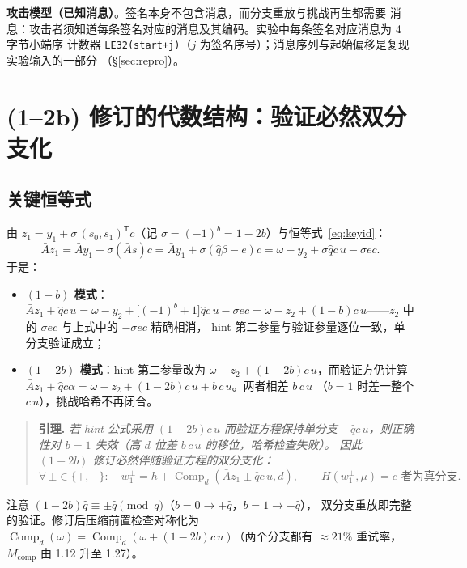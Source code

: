 \documentclass[UTF8,11pt,a4paper]{ctexart}
\newcommand{\Comp}{\operatorname{Comp}}
\newcommand{\code}[1]{\texttt{\small #1}}
\begin{document}
\noindent\textbf{攻击模型（已知消息）}。签名本身不包含消息，而分支重放与挑战再生都需要
消息：攻击者须知道每条签名对应的消息及其编码。实验中每条签名对应消息为 4 字节小端序
计数器 \code{LE32(start+j)}（$j$ 为签名序号）；消息序列与起始偏移是复现实验输入的一部分
（\S\ref{sec:repro}）。

\section{(1--2b) 修订的代数结构：验证必然双分支化}

\subsection{关键恒等式}

由 $z_1=y_1+\sigma\,(s_0,s_1)^{\mathsf T}c$（记 $\sigma=(-1)^b=1-2b$）与恒等式~\eqref{eq:keyid}：
\begin{equation}
\bar A z_1=\bar A y_1+\sigma(\bar As)c
=\bar A y_1+\sigma(\hat q\beta-e)c
=\omega-y_2+\sigma\hat q c\,u-\sigma e c .
\label{eq:Az}
\end{equation}
于是：
\begin{itemize}
\item \textbf{$(1-b)$ 模式}：
$\bar Az_1+\hat qc\,u=\omega-y_2+\bigl[(-1)^b+1\bigr]\hat qc\,u-\sigma ec
=\omega-z_2+(1-b)c\,u$——$z_2$ 中的 $\sigma ec$ 与上式中的 $-\sigma ec$ 精确相消，
hint 第二参量与验证参量逐位一致，单分支验证成立；
\item \textbf{$(1-2b)$ 模式}：hint 第二参量改为 $\omega-z_2+(1-2b)c\,u$，而验证方仍计算
$\bar Az_1+\hat qc\alpha=\omega-z_2+(1-2b)c\,u+b\,c\,u$。两者相差 $b\,c\,u$
（$b{=}1$ 时差一整个 $c\,u$），挑战哈希不再闭合。
\end{itemize}

\begin{quote}\textbf{引理.}\emph{ 若 hint 公式采用 $(1-2b)c\,u$ 而验证方程保持单分支
$+\hat qc\,u$，则正确性对 $b=1$ 失效（高 $d$ 位差 $b\,c\,u$ 的移位，哈希检查失败）。
因此 $(1-2b)$ 修订必然伴随验证方程的双分支化：}
\begin{equation*}
\forall\,\pm\in\{+,-\}:\quad
w_1^{\pm}=h+\Comp_d(\bar Az_1\pm\hat qc\,u,d),\qquad
H(w_1^{\pm},\mu)=c \text{ 者为真分支.}
\end{equation*}
\end{quote}
注意 $(1-2b)\hat q\equiv\pm\hat q\pmod q$（$b{=}0\to+\hat q$，$b{=}1\to-\hat q$），
双分支重放即完整的验证。修订后压缩前置检查对称化为
$\Comp_d(\omega)=\Comp_d(\omega+(1-2b)c\,u)$（两个分支都有 $\approx 21\%$ 重试率，
$M_{\mathrm{comp}}$ 由 1.12 升至 1.27）。
\end{document}
